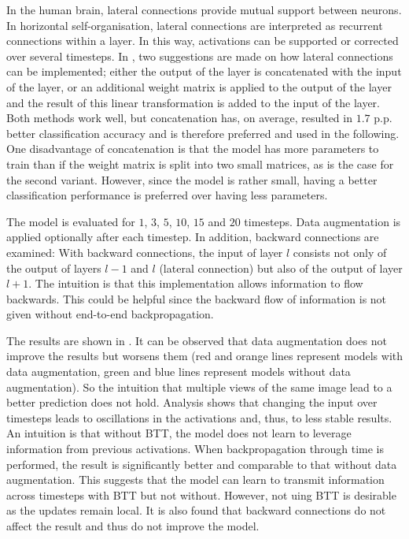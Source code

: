 In the human brain, lateral connections provide mutual support between neurons. In horizontal self-organisation, lateral connections are interpreted as recurrent connections within a layer. In this way, activations can be supported or corrected over several timesteps.
In , two suggestions are made on how lateral connections can be implemented; either the output of the layer is concatenated with the input of the layer, or an additional weight matrix is applied to the output of the layer and the result of this linear transformation is added to the input of the layer.
Both methods work well, but concatenation has, on average, resulted in $1.7$ p.p. better classification accuracy and is therefore preferred and used in the following. One disadvantage of concatenation is that the model has more parameters to train than if the weight matrix is split into two small matrices, as is the case for the second variant.
However, since the model is rather small, having a better classification performance is preferred over having less parameters.


The model is evaluated for $1$, $3$, $5$, $10$, $15$ and $20$ timesteps. Data augmentation is applied optionally after each timestep. In addition, backward connections are examined: With backward connections, the input of layer $l$ consists not only of the output of layers $l-1$ and $l$ (lateral connection) but also of the output of layer $l+1$. The intuition is that this implementation allows information to flow backwards. This could be helpful since the backward flow of information is not given without end-to-end backpropagation.

The results are shown in . It can be observed that data augmentation does not improve the results but worsens them (red and orange lines represent models with data augmentation, green and blue lines represent models without data augmentation). So the intuition that multiple views of the same image lead to a better prediction does not hold. Analysis shows that changing the input over timesteps leads to oscillations in the activations and, thus, to less stable results. An intuition is that without BTT, the model does not learn to leverage information from previous activations. When backpropagation through time is performed, the result is significantly better and comparable to that without data augmentation. This suggests that the model can learn to transmit information across timesteps with BTT but not without. However, not uing BTT is desirable as the updates remain local. It is also found that backward connections do not affect the result and thus do not improve the model.


